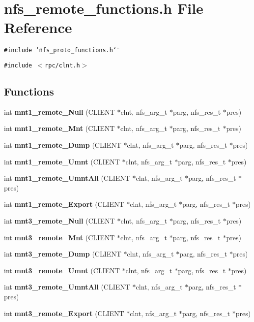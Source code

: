 \section{nfs\_\-remote\_\-functions.h File Reference}
\label{nfs__remote__functions_8h}
{\tt \#include \char`\"{}nfs\_\-proto\_\-functions.h\char`\"{}}\par
{\tt \#include $<$rpc/clnt.h$>$}\par
\subsection*{Functions}
\begin{CompactItemize}
\item 
int {\bf mnt1\_\-remote\_\-Null} (CLIENT $\ast$clnt, nfs\_\-arg\_\-t $\ast$parg, nfs\_\-res\_\-t $\ast$pres)
\item 
int {\bf mnt1\_\-remote\_\-Mnt} (CLIENT $\ast$clnt, nfs\_\-arg\_\-t $\ast$parg, nfs\_\-res\_\-t $\ast$pres)
\item 
int {\bf mnt1\_\-remote\_\-Dump} (CLIENT $\ast$clnt, nfs\_\-arg\_\-t $\ast$parg, nfs\_\-res\_\-t $\ast$pres)
\item 
int {\bf mnt1\_\-remote\_\-Umnt} (CLIENT $\ast$clnt, nfs\_\-arg\_\-t $\ast$parg, nfs\_\-res\_\-t $\ast$pres)
\item 
int {\bf mnt1\_\-remote\_\-Umnt\-All} (CLIENT $\ast$clnt, nfs\_\-arg\_\-t $\ast$parg, nfs\_\-res\_\-t $\ast$pres)
\item 
int {\bf mnt1\_\-remote\_\-Export} (CLIENT $\ast$clnt, nfs\_\-arg\_\-t $\ast$parg, nfs\_\-res\_\-t $\ast$pres)
\item 
int {\bf mnt3\_\-remote\_\-Null} (CLIENT $\ast$clnt, nfs\_\-arg\_\-t $\ast$parg, nfs\_\-res\_\-t $\ast$pres)
\item 
int {\bf mnt3\_\-remote\_\-Mnt} (CLIENT $\ast$clnt, nfs\_\-arg\_\-t $\ast$parg, nfs\_\-res\_\-t $\ast$pres)
\item 
int {\bf mnt3\_\-remote\_\-Dump} (CLIENT $\ast$clnt, nfs\_\-arg\_\-t $\ast$parg, nfs\_\-res\_\-t $\ast$pres)
\item 
int {\bf mnt3\_\-remote\_\-Umnt} (CLIENT $\ast$clnt, nfs\_\-arg\_\-t $\ast$parg, nfs\_\-res\_\-t $\ast$pres)
\item 
int {\bf mnt3\_\-remote\_\-Umnt\-All} (CLIENT $\ast$clnt, nfs\_\-arg\_\-t $\ast$parg, nfs\_\-res\_\-t $\ast$pres)
\item 
int {\bf mnt3\_\-remote\_\-Export} (CLIENT $\ast$clnt, nfs\_\-arg\_\-t $\ast$parg, nfs\_\-res\_\-t $\ast$pres)

\end{CompactItemize}
